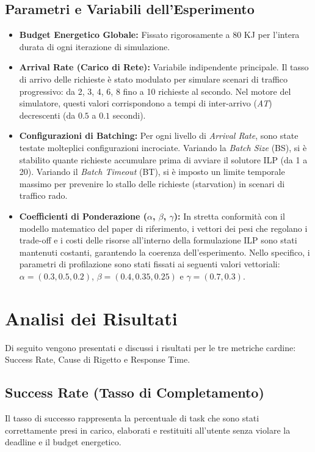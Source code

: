 \documentclass[11pt,a4paper]{article}
\begin{document}
\subsection{Parametri e Variabili dell'Esperimento}
\begin{itemize}
    \item \textbf{Budget Energetico Globale:} Fissato rigorosamente a 80 KJ per l'intera durata di ogni iterazione di simulazione.
    \item \textbf{Arrival Rate (Carico di Rete):} Variabile indipendente principale. Il tasso di arrivo delle richieste è stato modulato per simulare scenari di traffico progressivo: da 2, 3, 4, 6, 8 fino a 10 richieste al secondo. Nel motore del simulatore, questi valori corrispondono a tempi di inter-arrivo (\textit{AT}) decrescenti (da $0.5$ a $0.1$ secondi).
    \item \textbf{Configurazioni di Batching:} Per ogni livello di \textit{Arrival Rate}, sono state testate molteplici configurazioni incrociate. Variando la \textit{Batch Size} (BS), si è stabilito quante richieste accumulare prima di avviare il solutore ILP (da 1 a 20). Variando il \textit{Batch Timeout} (BT), si è imposto un limite temporale massimo per prevenire lo stallo delle richieste (starvation) in scenari di traffico rado.
    \item \textbf{Coefficienti di Ponderazione ($\alpha$, $\beta$, $\gamma$):} In stretta conformità con il modello matematico del paper di riferimento, i vettori dei pesi che regolano i trade-off e i costi delle risorse all'interno della formulazione ILP sono stati mantenuti costanti, garantendo la coerenza dell'esperimento. Nello specifico, i parametri di profilazione sono stati fissati ai seguenti valori vettoriali: $\alpha = (0.3, 0.5, 0.2)$, $\beta = (0.4, 0.35, 0.25)$ e $\gamma = (0.7, 0.3)$.
\end{itemize}


\section{Analisi dei Risultati}
Di seguito vengono presentati e discussi i risultati per le tre metriche cardine: Success Rate, Cause di Rigetto e Response Time.

\subsection{Success Rate (Tasso di Completamento)}
Il tasso di successo rappresenta la percentuale di task che sono stati correttamente presi in carico, elaborati e restituiti all'utente senza violare la deadline e il budget energetico.
\end{document}
